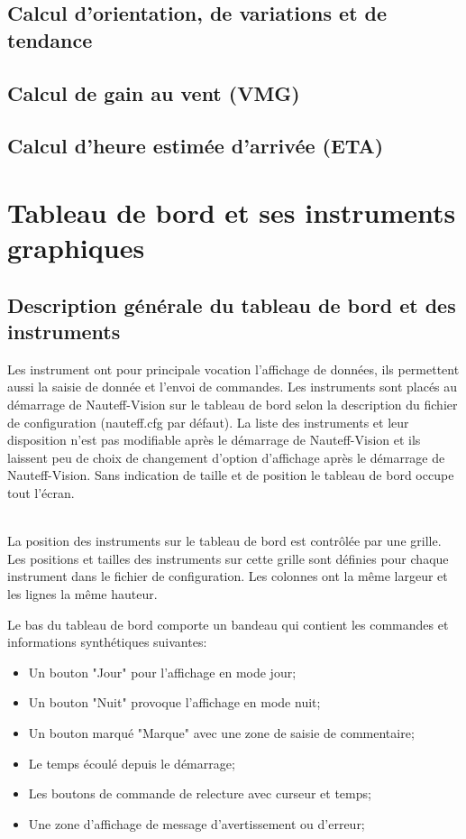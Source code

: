\documentclass[a4paper,11pt]{report}
\begin{document}
\subsection{Calcul d'orientation, de variations et de tendance}
\subsection{Calcul de gain au vent (VMG)}
\subsection{Calcul d'heure estimée d'arrivée (ETA)}

\section{Tableau de bord et ses instruments graphiques}

\subsection{Description générale du tableau de bord et des instruments}
Les instrument ont pour principale vocation l'affichage de données,
ils permettent aussi la saisie de donnée et l'envoi de commandes.
Les instruments sont placés au démarrage de Nauteff-Vision
sur le tableau de bord selon la description du fichier de configuration
(nauteff.cfg par défaut). La liste des instruments et leur disposition
n'est pas modifiable après le démarrage de Nauteff-Vision et 
ils laissent peu de choix de changement d'option d'affichage
après le démarrage de Nauteff-Vision.
Sans indication de taille et de position
le tableau de bord occupe tout l'écran.
\newline

%

\\

 
La position des instruments sur le tableau de bord est contrôlée par une grille.
Les positions et tailles des instruments sur cette grille sont définies
pour chaque instrument dans le fichier de configuration.
Les colonnes ont la même largeur et les lignes la même hauteur.
\newline

Le bas du tableau de bord comporte un bandeau qui contient
les commandes et informations synthétiques suivantes:
\begin{itemize}
	\item Un bouton "Jour" pour l'affichage en mode jour;
	\item Un bouton "Nuit" provoque l'affichage en mode nuit;
	\item Un bouton marqué "Marque" avec une zone de saisie de commentaire;
	\item Le temps écoulé depuis le démarrage;
	\item Les boutons de commande de relecture avec curseur et temps;
	\item Une zone d'affichage de message d'avertissement ou d'erreur;
\end{itemize}
\end{document}
